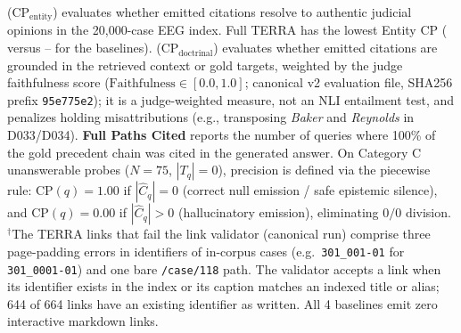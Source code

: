  ($\text{CP}_{\text{entity}}$) evaluates whether emitted citations resolve to authentic judicial opinions in the 20,000-case EEG index. Full TERRA has the lowest Entity CP (\CatBTerraEntityCitationPrecision{} versus \CatBGraphRAGEntityCitationPrecision{}--\CatBDirectEntityCitationPrecision{} for the baselines). 
 ($\text{CP}_{\text{doctrinal}}$) evaluates whether emitted citations are grounded in the retrieved context or gold targets, weighted by the judge faithfulness score ($\text{Faithfulness} \in [0.0, 1.0]$; canonical v2 evaluation file, SHA256 prefix \texttt{95e775e2}); it is a judge-weighted measure, not an NLI entailment test, and penalizes holding misattributions (e.g., transposing \textit{Baker} and \textit{Reynolds} in D033/D034). 
\textbf{Full Paths Cited} reports the number of queries where 100\% of the gold precedent chain was cited in the generated answer. 
On Category C unanswerable probes ($N=75$, $|T_q|=0$), precision is defined via the piecewise rule: $\text{CP}(q) = 1.00$ if $|\hat{C}_q|=0$ (correct null emission / safe epistemic silence), and $\text{CP}(q) = 0.00$ if $|\hat{C}_q|>0$ (hallucinatory emission), eliminating $0/0$ division. 
$^\dagger$The \TerraBrokenMarkdownLinks{} TERRA links that fail the link validator (canonical run) comprise three page-padding errors in identifiers of in-corpus cases (e.g.\ \texttt{301\_001-01} for \texttt{301\_0001-01}) and one bare \texttt{/case/118} path. The validator accepts a link when its identifier exists in the index or its caption matches an indexed title or alias; 644 of 664 links have an existing identifier as written. All 4 baselines emit zero interactive markdown links.